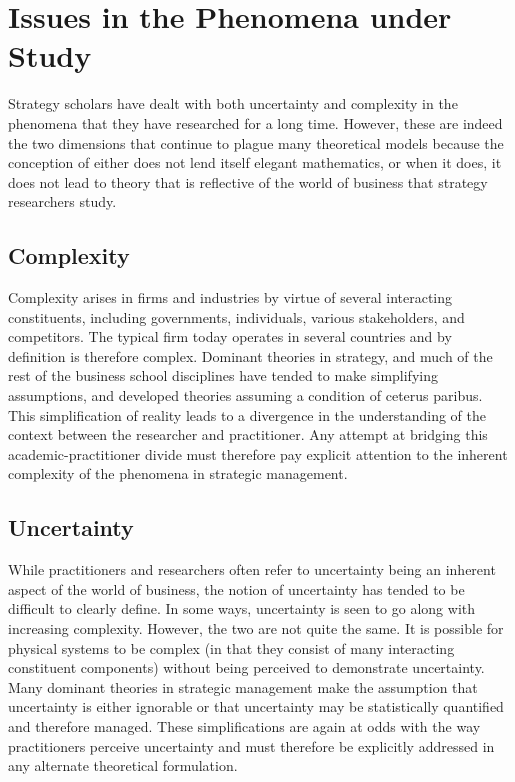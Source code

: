 \documentclass[12pt,letterpaper]{article}
\begin{document}
\section{Issues in the Phenomena under Study}
Strategy scholars have dealt with both uncertainty and complexity in the phenomena that they have researched for a long time. However, these are indeed the two dimensions that continue to plague many theoretical models because the conception of either does not lend itself elegant mathematics, or when it does, it does not lead to theory that is reflective of the world of business that strategy researchers study. 
\subsection{Complexity}
Complexity arises in firms and industries by virtue of several interacting constituents, including governments, individuals, various stakeholders, and competitors. The typical firm today operates in several countries and by definition is therefore complex. Dominant theories in strategy, and much of the rest of the business school disciplines have tended to make simplifying assumptions, and developed theories assuming a condition of ceterus paribus. This simplification of reality leads to a divergence in the understanding of the context between the researcher and practitioner. Any attempt at bridging this academic-practitioner divide must therefore pay explicit attention to the inherent complexity of the phenomena in strategic management.
\subsection{Uncertainty}
While practitioners and researchers often refer to uncertainty being an inherent aspect of the world of business, the notion of uncertainty has tended to be difficult to clearly define. In some ways, uncertainty is seen to go along with increasing complexity. However, the two are not quite the same. It is possible for physical systems to be complex (in that they consist of many interacting constituent components) without being perceived to demonstrate uncertainty. Many dominant theories in strategic management make the assumption that uncertainty is either ignorable or that uncertainty may be statistically quantified and therefore managed. These simplifications are again at odds with the way practitioners perceive uncertainty and must therefore be explicitly addressed in any alternate theoretical formulation.
\end{document}
